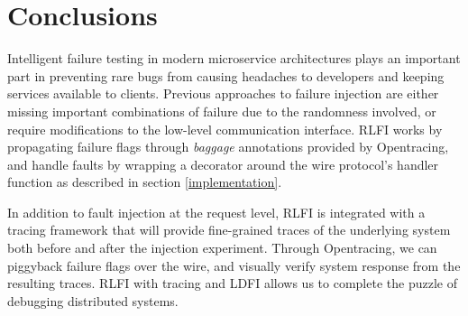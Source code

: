 

\section{Conclusions}
Intelligent failure testing in modern microservice architectures plays an important part in preventing rare bugs from causing headaches to developers and keeping services available to clients. Previous approaches to failure injection are either missing important combinations of failure due to the randomness involved, or require modifications to the low-level communication interface. RLFI works by propagating failure flags through \textit{baggage} annotations provided by Opentracing\cite{opentracing:doc}, and handle faults by wrapping a decorator around the wire protocol's handler function as described in section \ref{implementation}. 

In addition to fault injection at the request level, RLFI is integrated with a tracing framework that will provide fine-grained traces of the underlying system both before and after the injection experiment. Through Opentracing, we can piggyback failure flags over the wire, and visually verify system response from the resulting traces. RLFI with tracing and LDFI\cite{alvaro:ldfi} allows us to complete the puzzle of debugging distributed systems.


